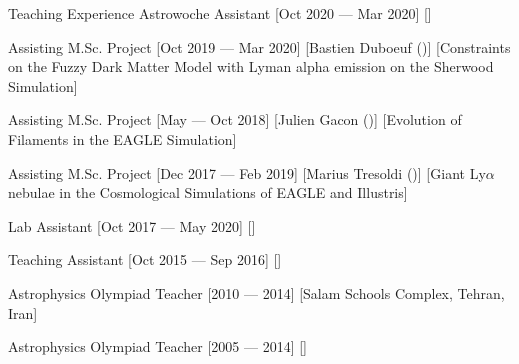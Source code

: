 \begin{cvsection}{Teaching Experience}
    \cvitem
    {Astrowoche Assistant}
    [Oct 2020 --- Mar 2020]
    [\ipa]
    
    \cvitem
    {Assisting M.Sc. Project}
    [Oct 2019 --- Mar 2020]
    [Bastien Duboeuf (\ipa)]
    [Constraints on the Fuzzy Dark Matter Model with Lyman alpha emission on the Sherwood Simulation]
    
    \cvitem
    {Assisting M.Sc. Project}
    [May --- Oct 2018]
    [Julien Gacon (\ipa)]
    [Evolution of Filaments in the EAGLE Simulation]
    
    \cvitem
    {Assisting M.Sc. Project}
    [Dec 2017 --- Feb 2019]
    [Marius Tresoldi (\ipa)]
    [Giant Ly$\alpha$ nebulae in the Cosmological Simulations of EAGLE and Illustris]
    
    \cvitem
    {Lab Assistant}
    [Oct 2017 --- May 2020]
    [\eth]
    
    \cvitem
    {Teaching Assistant}
    [Oct 2015 --- Sep 2016]
    [\AIfA]
    
    
    
    \cvitem
    {Astrophysics Olympiad Teacher}
    [2010 --- 2014]
    [Salam Schools Complex, Tehran, Iran]
    
    \cvitem
    {Astrophysics Olympiad Teacher}
    [2005 --- 2014]
    [\NODET]
\end{cvsection}